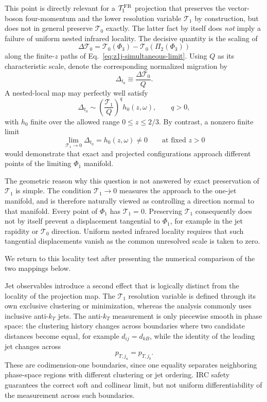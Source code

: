 \documentclass[11pt]{article}
\newcommand{\Ph}{\Phi}
\begin{document}
This point is directly relevant for a $\mathcal T_1^{\rm FR}$ projection that preserves the vector-boson
four-momentum and the lower resolution variable $\mathcal T_1$ by construction, but does not in general preserve $\mathcal T_0$ exactly.
The latter fact by itself does \emph{not} imply a failure of uniform nested infrared locality. The decisive
quantity is the scaling of
\begin{equation}
\Delta\mathcal T_0
=
\mathcal T_0(\Ph_3)
-
\mathcal T_0\!\left(\Pi_2(\Ph_3)\right)
\label{eq:z1j-delta-t0}
\end{equation}
along the finite-$z$ paths of Eq.~\eqref{eq:z1j-simultaneous-limit}. Using \(Q\) as its characteristic scale,
denote the corresponding normalized migration by
\[
\Delta_{t_0}
\equiv
\frac{\Delta\mathcal T_0}{Q}.
\]
A nested-local map may perfectly well satisfy
\begin{equation}
\Delta_{t_0}
\sim
\left(\frac{\mathcal T_1}{Q}\right)^q
h_0(z,\omega),
\qquad q>0,
\label{eq:z1j-t0-nested-local-scaling}
\end{equation}
with $h_0$ finite over the allowed range $0\le z\le2/3$. By contrast, a nonzero finite limit
\begin{equation}
\lim_{\mathcal T_1\to0}
\Delta_{t_0}
=h_0(z,\omega)\neq0
\qquad
\text{at fixed }z>0
\label{eq:z1j-t0-nested-failure}
\end{equation}
would demonstrate that exact and projected configurations approach different points of the limiting
$\Ph_1$ manifold.

The geometric reason why this question is not answered by exact preservation of $\mathcal T_1$ is simple.
The condition $\mathcal T_1\to0$ measures the approach to the one-jet manifold, and is therefore naturally
viewed as controlling a direction normal to that manifold. Every point of $\Ph_1$ has $\mathcal T_1=0$.
Preserving $\mathcal T_1$ consequently does not by itself prevent a displacement tangential to $\Ph_1$,
for example in the jet rapidity or $\mathcal T_0$ direction. Uniform nested infrared locality requires that
such tangential displacements vanish as the common unresolved scale is taken to zero.

We return to this locality test after presenting the numerical comparison of the two mappings below.

Jet observables introduce a second effect that is logically distinct from the locality of the projection map.
The $\mathcal T_1$ resolution variable is defined through its own exclusive clustering or minimization,
whereas the analysis commonly uses inclusive anti-$k_T$ jets. The anti-$k_T$ measurement is only piecewise
smooth in phase space: the clustering history changes across boundaries where two candidate distances become
equal, for example $d_{ij}=d_{kB}$, while the identity of the leading jet changes across
\begin{equation}
p_{T,j_a}=p_{T,j_b}.
\label{eq:z1j-leading-jet-boundary}
\end{equation}
These are codimension-one boundaries, since one equality separates neighboring phase-space regions with
different clustering or jet ordering. IRC safety guarantees the correct soft and collinear limit, but not
uniform differentiability of the measurement across such boundaries.
\end{document}
